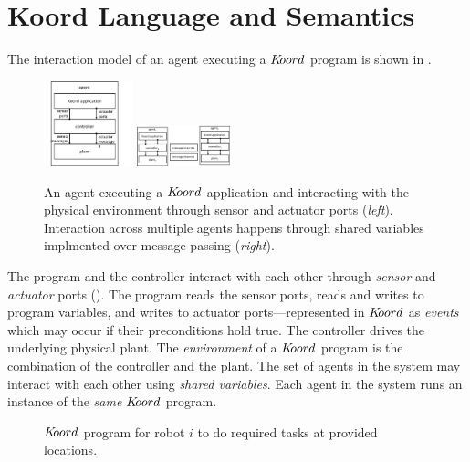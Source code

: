 \section{Koord Language and Semantics}
\label{sec:semantics}
The interaction model of an agent executing a $K\kern-2pt oord$ program is shown in . 
\begin{figure}[h!]
\centering
\includegraphics[width=0.23\textwidth]{figs/arch.png}
\includegraphics[width=0.24\textwidth]{figs/agents2.png}
\caption{\small An agent executing a $K\kern-2pt oord$ application and interacting with the physical environment through sensor and actuator ports ({\em left}). Interaction across multiple agents happens through shared variables implmented over message passing ({\em right}).}
\label{fig:arch}
\end{figure}
The program and the controller interact with each other through {\em sensor} and {\em actuator} ports ().  The program reads the sensor ports, reads and writes to program variables, and writes to actuator ports---represented in $K\kern-2pt oord$ as \emph{events} which may occur if their preconditions hold true. The controller drives the underlying physical plant. The \emph{environment} of a  $K\kern-2pt oord$ program is the combination of the controller and the plant. The set of agents in the system may interact with each other using {\em shared variables\/}. Each agent in the system runs an instance of the \emph{same} $K\kern-2pt oord$ program. 
\begin{figure}[ht!]
    \noindent
    \begin{mdframed}

    \begin{center}
        \scriptsize
        {}
        {}
    \end{center}
    \end{mdframed}

    \caption{$K\kern-2pt oord$ program for robot $i$ to do required tasks at provided locations.}
    \label{fig:taskapp}
\end{figure}
    
